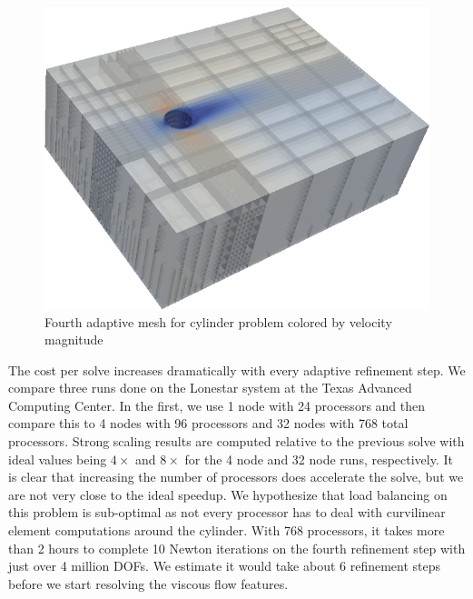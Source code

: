 \documentclass[Dissertation.tex]{subfiles}
\begin{document}
\begin{figure}[!ht]
\centering
\includegraphics[width=\textwidth]{Dissertation/Cylinder/Mesh_uMag4.png}
\caption{Fourth adaptive mesh for cylinder problem colored by velocity magnitude}
\label{fig:CylinderMesh4}
\end{figure}

The cost per solve increases dramatically with every adaptive refinement step.
We compare three runs done on the Lonestar system at the Texas Advanced Computing Center.
In the first, we use 1 node with 24 processors and then compare this to 4 nodes with 96 processors and
32 nodes with 768 total processors.
Strong scaling results are computed relative to the previous solve 
with ideal values being $4\times$ and $8\times$ for the 4 node and 32 node runs, respectively.
It is clear that increasing the number of processors does accelerate the solve, but we are not
very close to the ideal speedup.
We hypothesize that load balancing on this problem is sub-optimal as not every processor has
to deal with curvilinear element computations around the cylinder.
With 768 processors, it takes more than 2 hours to complete 10 Newton iterations 
on the fourth refinement step with just over 4 million DOFs.
We estimate it would take about 6 refinement steps before we start resolving the viscous flow features.
\end{document}
